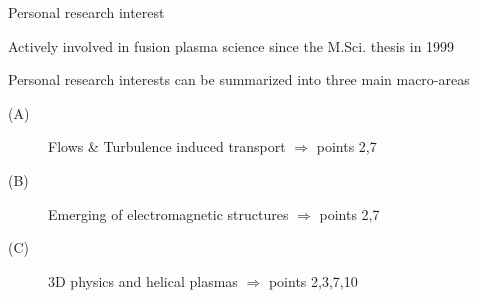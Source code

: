 \documentclass[t,10pt]{beamer}
\begin{document}
\begin{frame}{Personal research interest}
\begin{itemize}
{\large\item Actively involved in fusion plasma science since the
M.Sci. thesis in 1999
\item Personal research interests can be summarized into three main
  macro-areas
\begin{description}
\item[(A)] \textcolor{taorange}{Flows \& Turbulence induced transport
    $\Rightarrow$ points 2,7}
\item[(B)]\textcolor{ta3chameleon}{Emerging of electromagnetic
    structures $\Rightarrow$ points 2,7}
\item[(C)] \textcolor{tascarletred}{3D physics and helical plasmas
    $\Rightarrow$ points 2,3,7,10}
\end{description}
}\end{itemize}
\end{frame}
\end{document}

